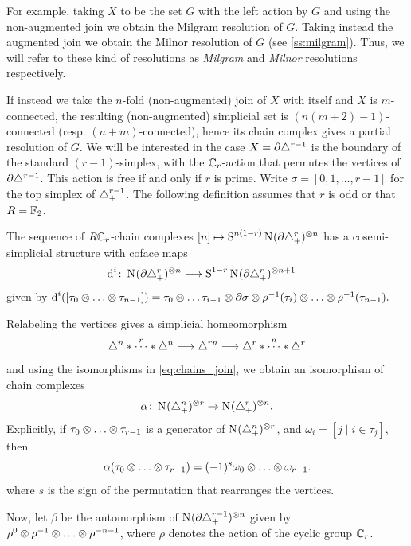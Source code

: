 For example, taking $X$ to be the set $G$ with the left action by $G$ and using the non-augmented join we obtain the Milgram resolution of $G$. Taking instead the augmented join we obtain the Milnor resolution of $G$ (see \cref{ss:milgram}). Thus, we will refer to these kind of resolutions as \emph{Milgram} and \emph{Milnor} resolutions respectively.

If instead we take the $n$-fold (non-augmented) join of $X$ with itself and $X$ is $m$-connected, the resulting (non-augmented) simplicial set is $(n(m+2)-1)$-connected (resp. $(n+m)$-connected), hence its chain complex gives a partial resolution of $G$. We will be interested in the case $X=\partial \triangle^{r-1}$ is the boundary of the standard $(r-1)$-simplex, with the $\mathbb{C}_r$-action that permutes the vertices of $\partial \triangle^{r-1}$. This action is free if and only if $r$ is prime. Write $\sigma = [0,1,\ldots,r-1]$ for the top simplex of $\triangle_{+}^{r-1}$. The following definition assumes that $r$ is odd or that $R=\mathbb{F}_2$.

\begin{definition}\label{def:milnor}
	The sequence of $R\mathbb{C}_r$-chain complexes $[n]\mapsto \operatorname{S}^{n(1-r)}\operatorname{N}_{}(\partial\triangle_{+}^{r})^{\otimes n}$ has a cosemi-simplicial structure with coface maps
	\begin{align*}
		\operatorname{d}^i\colon \operatorname{N}_{}(\partial \triangle_{+}^{r})^{\otimes n} &\longrightarrow \operatorname{S}^{1-r}\operatorname{N}_{}(\partial \triangle_{+}^{r})^{\otimes n+1}
	\end{align*}
	given by $\d^i([\tau_0\ot \dots \ot\tau_{n-1}]) = \tau_0\ot \dots \tau_{i-1}\ot \partial\sigma \ot \rho^{-1}(\tau_i) \ot \dots \ot \rho^{-1}(\tau_{n-1}).
	$%
\end{definition}

Relabeling the vertices gives a simplicial homeomorphism
\[
\triangle^n*\overset{r}{\cdots}*\triangle^n
\longrightarrow
\triangle^{rn}
\longrightarrow
\triangle^{r}*\overset{n}{\cdots}*\triangle^{r}
\]
and using the isomorphisms in \eqref{eq:chains_join}, we obtain an isomorphism of chain complexes
\[
\alpha\colon \operatorname{N}_{}(\triangle_{+}^n)^{\otimes r}
\to
\operatorname{N}_{}(\triangle_{+}^{r})^{\otimes n}.
\]
Explicitly, if $\tau_0\otimes \ldots \otimes \tau_{r-1}$ is a generator of $\operatorname{N}_{}(\triangle_{+}^{n})^{\otimes r}$, and $\omega_i = [j \mid i\in \tau_j]$, then
\[
\alpha(\tau_0\otimes \ldots \otimes \tau_{r-1})
= (-1)^{s}\omega_0\otimes\ldots \otimes \omega_{r-1}.
\]
where $s$ is the sign of the permutation that rearranges the vertices.

Now, let $\beta$ be the automorphism of $\operatorname{N}_{}(\partial\triangle_{+}^{r-1})^{\otimes n}$ given by $\rho^0\otimes \rho^{-1}\otimes\ldots \otimes \rho^{-n-1}$, where $\rho$ denotes the action of the cyclic group $\mathbb{C}_r$. 

